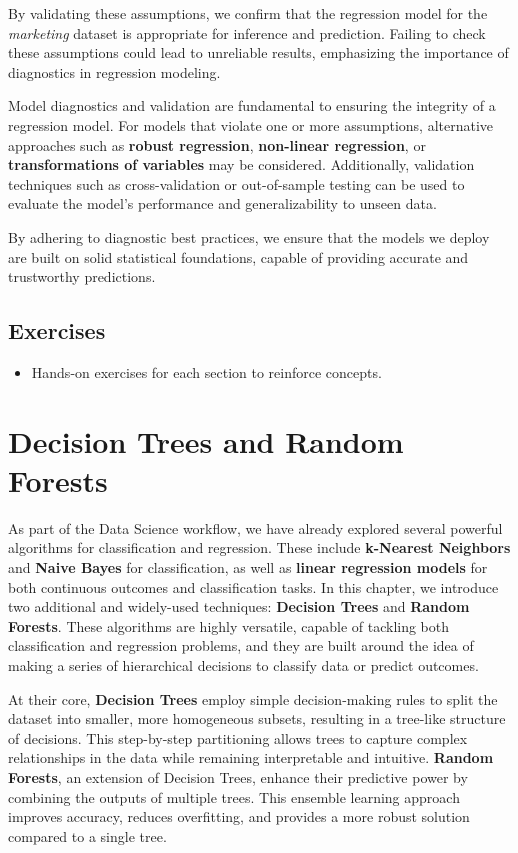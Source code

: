 \documentclass[
]{book}
\providecommand{\tightlist}{%
  \setlength{\itemsep}{0pt}\setlength{\parskip}{0pt}}
\theoremstyle{definition}
\theoremstyle{definition}
\theoremstyle{definition}
\theoremstyle{definition}
\theoremstyle{remark}
\begin{document}
By validating these assumptions, we confirm that the regression model for the \emph{marketing} dataset is appropriate for inference and prediction. Failing to check these assumptions could lead to unreliable results, emphasizing the importance of diagnostics in regression modeling.

Model diagnostics and validation are fundamental to ensuring the integrity of a regression model. For models that violate one or more assumptions, alternative approaches such as \textbf{robust regression}, \textbf{non-linear regression}, or \textbf{transformations of variables} may be considered. Additionally, validation techniques such as cross-validation or out-of-sample testing can be used to evaluate the model's performance and generalizability to unseen data.

By adhering to diagnostic best practices, we ensure that the models we deploy are built on solid statistical foundations, capable of providing accurate and trustworthy predictions.

\section{\texorpdfstring{\textbf{Exercises}}{Exercises}}\label{exercises-8}

\begin{itemize}
\tightlist
\item
  Hands-on exercises for each section to reinforce concepts.
\end{itemize}

\chapter{Decision Trees and Random Forests}\label{chapter-tree}

As part of the Data Science workflow, we have already explored several powerful algorithms for classification and regression. These include \textbf{k-Nearest Neighbors} and \textbf{Naive Bayes} for classification, as well as \textbf{linear regression models} for both continuous outcomes and classification tasks. In this chapter, we introduce two additional and widely-used techniques: \textbf{Decision Trees} and \textbf{Random Forests}. These algorithms are highly versatile, capable of tackling both classification and regression problems, and they are built around the idea of making a series of hierarchical decisions to classify data or predict outcomes.

At their core, \textbf{Decision Trees} employ simple decision-making rules to split the dataset into smaller, more homogeneous subsets, resulting in a tree-like structure of decisions. This step-by-step partitioning allows trees to capture complex relationships in the data while remaining interpretable and intuitive. \textbf{Random Forests}, an extension of Decision Trees, enhance their predictive power by combining the outputs of multiple trees. This ensemble learning approach improves accuracy, reduces overfitting, and provides a more robust solution compared to a single tree.
\end{document}
